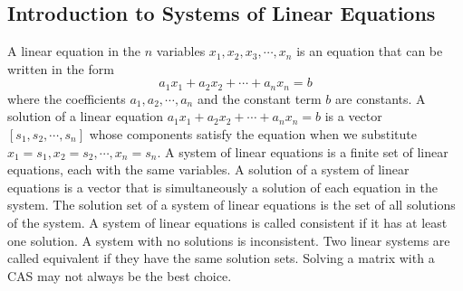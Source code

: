 \documentclass{article}
\begin{document}
        \subsection{Introduction to Systems of Linear Equations}
        \begin{outline}
            \1 A linear equation in the $n$ variables \(x_1,x_2,x_3,\cdots,x_n\) is an equation that can be written in the form \[a_1x_1+a_2x_2+\cdots+a_nx_n=b\] where the coefficients \(a_1,a_2,\cdots,a_n\) and the constant term $b$ are constants. 
            \1 A solution of a linear equation \(a_1x_1+a_2x_2+\cdots+a_nx_n=b\) is a vector \([s_1,s_2,\cdots,s_n]\) whose components satisfy the equation when we substitute \(x_1=s_1,x_2=s_2,\cdots,x_n=s_n\). 
            \1 A system of linear equations is a finite set of linear equations, each with the same variables. A solution of a system of linear equations is a vector that is simultaneously a solution of each equation in the system. The solution set of a system of linear equations is the set of all solutions of the system. 
            \1 A system of linear equations is called consistent if it has at least one solution. A system with no solutions is inconsistent. 
            \1 Two linear systems are called equivalent if they have the same solution sets. 
            \1 Solving a matrix with a CAS may not always be the best choice. 
        \end{outline}
\end{document}
